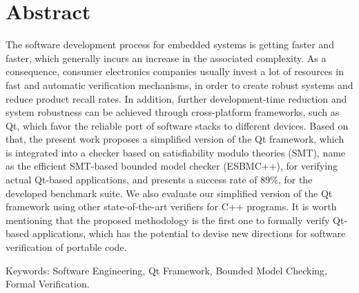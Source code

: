 \chapter*{Abstract}
\thispagestyle{empty}


The software development process for embedded systems is getting faster and faster, which generally incurs an increase in the associated complexity. As a consequence, consumer electronics companies usually invest a lot of resources in fast and automatic verification mechanisms, in order to create robust systems and reduce product recall rates. In addition, further development-time reduction and system robustness can be achieved through cross-platform frameworks, such as Qt, which favor the reliable port of software stacks to different devices. Based on that, the present work proposes a simplified version of the Qt framework, which is integrated into a checker based on satisfiability modulo theories (SMT), name as the efficient SMT-based bounded model checker (ESBMC++), for verifying actual Qt-based applications, and presents a success rate of 89\%, for the developed benchmark suite. We also evaluate our simplified version of the Qt framework using other state-of-the-art verifiers for C++ programs. It is worth mentioning that the proposed methodology is the first one to formally verify Qt-based applications, which has the potential to devise new directions for software verification of portable code.


\noindent \textsf{Keywords:} Software Engineering, Qt Framework, Bounded Model Checking, Formal Verification.


\cleardoublepage
